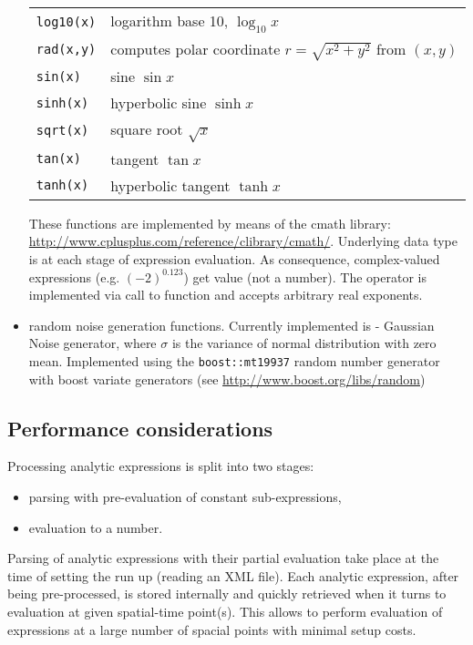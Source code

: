 \begin{itemize}
\begin{center}
\begin{tabular}{ll}
  \texttt{log10(x)}   & logarithm base 10, $\log_{10} x$ \\
  \texttt{rad(x,y)}   & computes polar coordinate $r=\sqrt{x^2+y^2}$ from $(x,y)$\\
  \texttt{sin(x)}     & sine $\sin x$ \\
  \texttt{sinh(x)}    & hyperbolic sine $\sinh x$ \\
  \texttt{sqrt(x)}    & square root $\sqrt{x}$ \\
  \texttt{tan(x)}     & tangent $\tan x$ \\
  \texttt{tanh(x)}    & hyperbolic tangent $\tanh x$ \\
  \bottomrule
\end{tabular}
\end{center}

These functions are implemented by means of the cmath library:
\url{http://www.cplusplus.com/reference/clibrary/cmath/}. Underlying data type
is  at each stage of expression evaluation. As consequence,
complex-valued expressions (e.g. $(-2)^0.123$) get value  (not a
number). The operator \inlsh{\^{}} is implemented via call to 
function and accepts arbitrary real exponents.

\item random noise generation functions. Currently implemented is
 - Gaussian Noise generator, where $\sigma$ is the variance
of normal distribution with zero mean. Implemented using the
\texttt{boost::mt19937} random number generator with boost variate generators
(see \url{http://www.boost.org/libs/random})
\end{itemize}

\subsection{Performance considerations}
Processing analytic expressions is split into two stages:
\begin{itemize}
\item parsing with pre-evaluation of constant sub-expressions,
\item evaluation to a number.
\end{itemize}
Parsing of analytic expressions with their partial evaluation take place at the
time of setting the run up (reading an XML file). Each analytic expression,
after being pre-processed, is stored internally and quickly retrieved when it
turns to evaluation at given spatial-time point(s). This allows to perform
evaluation of expressions at a large number of spacial points with minimal setup
costs.

